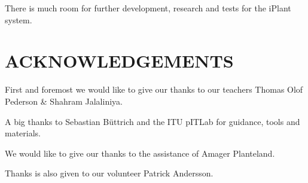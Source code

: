 \documentclass{ubicomp2012}
\begin{document}
There is much room for further development, research and tests for the iPlant system.

\nocite{Smart-Homes-and-the-People-Who-Live-in-Them}
\section{ACKNOWLEDGEMENTS}
First and foremost we would like to give our thanks to our teachers Thomas Olof Pederson \& Shahram Jalaliniya.

A big thanks to Sebastian B\"uttrich and the ITU pITLab for guidance, tools and materials.

We would like to give our thanks to the assistance of Amager Planteland.

Thanks is also given to our volunteer Patrick Andersson.

\vfill\eject



\end{document}
